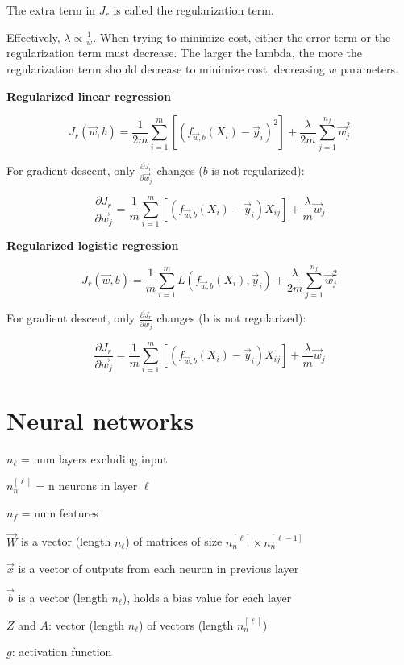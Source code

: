 \documentclass[12pt]{article}
\begin{document}
The extra term in $J_r$ is called the regularization term.

Effectively, $\lambda \propto \frac{1}{w}$. When trying to minimize cost, either the error term or the regularization term must decrease. The larger the lambda, the more the regularization term should decrease to minimize cost, decreasing $w$ parameters.

\noindent \textbf{Regularized linear regression}

\[ J_r(\vec{w},b) = \frac{1}{2m} \sum_{i=1}^m \left[(f_{\vec{w},b}(X_i) - \vec{y}_i)^2\right] + \frac{\lambda}{2m} \sum_{j=1}^{n_f} \vec{w}_j^2 \]

For gradient descent, only $\frac{\partial J_r}{\partial \vec{w}_j}$ changes ($b$ is not regularized):

\[ \frac{\partial J_r}{\partial \vec{w}_j} = \frac{1}{m} \sum_{i=1}^m \left[(f_{\vec{w},b}(X_i) - \vec{y}_i)X_{ij}\right] + \frac{\lambda}{m} \vec{w}_j \]

\noindent \textbf{Regularized logistic regression}

\[ J_r(\vec{w},b) = \frac{1}{m} \sum_{i=1}^m L(f_{\vec{w},b}(X_i), \vec{y}_i) + \frac{\lambda}{2m} \sum_{j=1}^{n_f} \vec{w}_j^2 \]

For gradient descent, only $\frac{\partial J_r}{\partial w_j}$ changes (b is not regularized):

\[ \frac{\partial J_r}{\partial \vec{w}_j} = \frac{1}{m} \sum_{i=1}^m \left[(f_{\vec{w},b}(X_i) - \vec{y}_i)X_{ij}\right] + \frac{\lambda}{m} \vec{w}_j \]

\pagebreak

\section{Neural networks}

$n_{\ell}$ = num layers excluding input

$n^{[\ell]}_n$ = n neurons in layer $\ell$

$n_f$ = num features

$\vec{W}$ is a vector (length $n_{\ell}$) of matrices of size $n^{[\ell]}_n \times n^{[\ell-1]}_n$

$\vec{x}$ is a vector of outputs from each neuron in previous layer

$\vec{b}$ is a vector (length $n_{\ell}$), holds a bias value for each layer

$Z$ and $A$: vector (length $n_{\ell}$) of vectors (length $n^{[\ell]}_n$)

$g$: activation function
\end{document}
